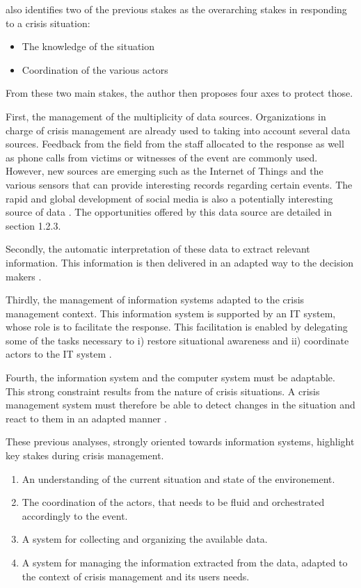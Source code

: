 \cite{batardIntegrerContributionsCitoyennes2021} also identifies two of the previous stakes as the overarching stakes in responding to a crisis situation:
\begin{itemize}
    \item The knowledge of the situation
    \item Coordination of the various actors
\end{itemize}
From these two main stakes, the author then proposes four axes to protect those.

First, the management of the multiplicity of data sources.
Organizations in charge of crisis management are already used to taking into account several data sources.
Feedback from the field from the staff allocated to the response as well as phone calls from victims or witnesses of the event are commonly used.
However, new sources are emerging such as the Internet of Things and the various sensors that can provide interesting records regarding certain events.
The rapid and global development of social media is also a potentially interesting source of data \cite{meierStrengtheningHumanitarianInformation2013}.
The opportunities offered by this data source are detailed in section 1.2.3.

Secondly, the automatic interpretation of these data to extract relevant information.
This information is then delivered in an adapted way to the decision makers \cite{luokkalaDevelopingInformationSystems2014,vandewalleImprovingSituationAwareness2016}.

Thirdly, the management of information systems adapted to the crisis management context.
This information system is supported by an IT system, whose role is to facilitate the response.
This facilitation is enabled by delegating some of the tasks necessary to i) restore situational awareness and ii) coordinate actors to the IT system \cite{benabenManagementCollaborativeBehavior2015}.

Fourth, the information system and the computer system must be adaptable.
This strong constraint results from the nature of crisis situations.
A crisis management system must therefore be able to detect changes in the situation and react to them in an adapted manner \cite{barthe-delanoeEventdrivenAgilityInteroperability2014,charlesModelDefineAssess2010}.

These previous analyses, strongly oriented towards information systems, highlight key stakes during crisis management.
\begin{enumerate}
    \item An understanding of the current situation and state of the environement.
    \item The coordination of the actors, that needs to be fluid and orchestrated accordingly to the event.
    \item A system for collecting and organizing the available data.
    \item A system for managing the information extracted from the data, adapted to the context of crisis management and its users needs.
\end{enumerate}

